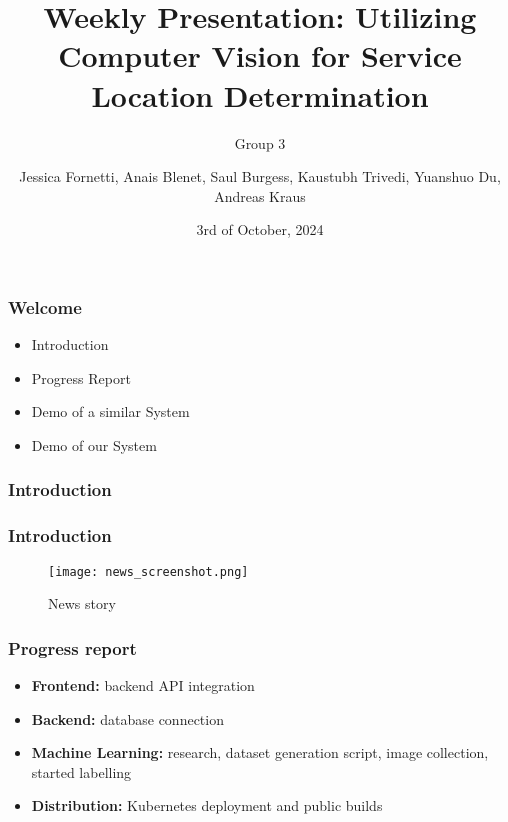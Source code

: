 \documentclass{beamer}
\title[Weekly Presentation]{Weekly Presentation: Utilizing Computer Vision for
Service Location Determination}
\subtitle{Group 3}
\author{Jessica Fornetti, Anais Blenet, Saul Burgess, Kaustubh Trivedi, Yuanshuo Du, Andreas Kraus}
\institute{TU Dublin}
\date{3rd of October, 2024}
\begin{document}
\frame{\titlepage}

\begin{frame}
    \frametitle{Welcome}
    \vspace{10pt} %
    
    \begin{itemize}
        \item{Introduction}
        \item{Progress Report}
        \item{Demo of a similar System}
        \item{Demo of our System}
    \end{itemize}
\end{frame}

\begin{frame}
    \frametitle{Introduction}
    \vspace{10pt} %

\end{frame}

\begin{frame}
    \frametitle{Introduction}
    \vspace{10pt} %
    \begin{figure}
        \centering{}
        \texttt{[image: news\_screenshot.png]}
        \caption{News story}
    \end{figure}
\end{frame}

\begin{frame}
    \frametitle{Progress report}
    \begin{itemize}
        \item\textbf{Frontend:} backend API integration
        \item\textbf{Backend:} database connection
        \item\textbf{Machine Learning:} research, dataset generation script, image collection, started labelling
        \item\textbf{Distribution:} Kubernetes deployment and public builds

    \end{itemize}

\end{frame}
\end{document}
